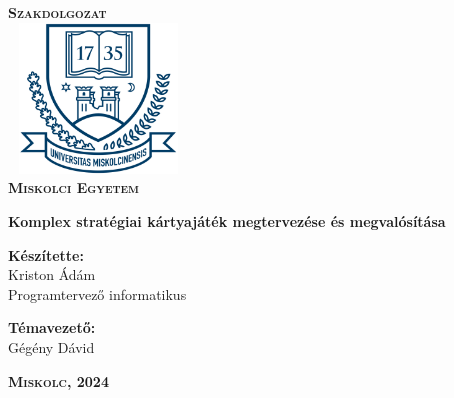 \begin{titlepage}
\centering
\vspace*{2cm}
\huge\textsc{\textbf{Szakdolgozat}}\\[1cm]
\includegraphics[width=4.8cm, height=4cm,keepaspectratio]{images/me_logo.png}\\
\textbf{\textsc{Miskolci Egyetem}}

\vspace*{2cm}

{\LARGE\textbf{Komplex stratégiai kártyajáték megtervezése és megvalósítása}}

\vspace*{2cm}
\large
\textbf{Készítette:}\\[0.8ex]
Kriston Ádám\\[0.8ex]
Programtervező informatikus

\vspace*{0.5cm}
\textbf{Témavezető:}\\[0.8ex]
Gégény Dávid

\vfill

\large
\textbf{\textsc{Miskolc, 2024}}

\end{titlepage}
